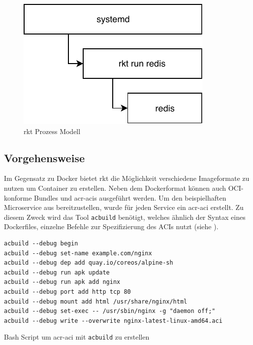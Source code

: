 \begin{figure}[h]
	\begin{center}
		\includegraphics[scale=0.9]{bilder/rkt-process.pdf}
		\caption{rkt Prozess Modell \citep{RktVsOtherProjects}}
		\label{fig:rktProcessModell}		
	\end{center}
\end{figure}


\subsection{Vorgehensweise}
\label{sec:compRktVorgehen}

Im Gegensatz zu Docker bietet rkt die Möglichkeit verschiedene Imageformate zu nutzen um Container zu erstellen. Neben dem Dockerformat können auch OCI-konforme Bundles und \glspl{acr-aci} ausgeführt werden. Um den beispielhaften Microservice aus  bereitzustellen, wurde für jeden Service ein \gls{acr-aci} erstellt. Zu diesem Zweck wird das Tool \texttt{acbuild} benötigt, welches ähnlich der Syntax eines Dockerfiles, einzelne Befehle zur Spezifizierung des ACIs nutzt (siehe ).

\begin{listing}[h]
	\begin{verbatim}
acbuild --debug begin
acbuild --debug set-name example.com/nginx
acbuild --debug dep add quay.io/coreos/alpine-sh
acbuild --debug run apk update
acbuild --debug run apk add nginx
acbuild --debug port add http tcp 80
acbuild --debug mount add html /usr/share/nginx/html
acbuild --debug set-exec -- /usr/sbin/nginx -g "daemon off;"
acbuild --debug write --overwrite nginx-latest-linux-amd64.aci
	\end{verbatim}
	\caption{Bash Script um \gls{acr-aci} mit \texttt{acbuild} zu erstellen \citep{AppContainer}}
	\label{lst:acbuildCommands}
\end{listing}


